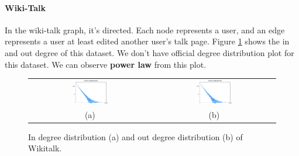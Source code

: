 \paragraph{Wiki-Talk}
In the wiki-talk graph, it's directed. Each node represents a user, and an edge represents a user at least edited another user's talk page. Figure \ref{t1:wiki} shows the in and out degree of this dataset. We don't have official degree distribution plot for this dataset. We can observe {\bf power law} from this plot. 
\begin{figure}[!htbf]
\begin{center}
\begin{tabular}{c c}
     \includegraphics[width=0.3\textwidth]{FIG/t1_wiki_in.png} &
     \includegraphics[width=0.3\textwidth]{FIG/t1_wiki_out.png} \\
    (a) & (b) \\
\end{tabular}
\caption{In degree distribution (a) and out degree distribution (b) of Wikitalk.}
\label{t1:wiki}
\end{center}
\end{figure}

